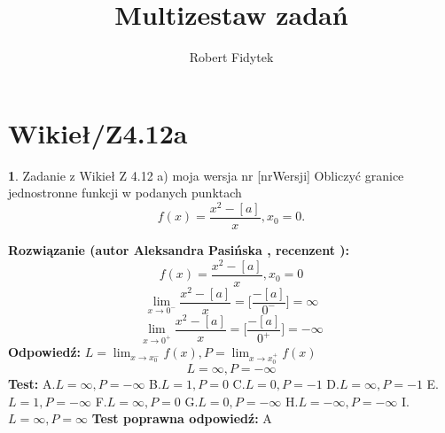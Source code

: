 \documentclass[12pt, a4paper]{article}
\title{Multizestaw zadań}
\author{Robert Fidytek}
\date{}
\theoremstyle{definition} %
\newtheorem{zad}{}
\newcommand{\kategoria}[1]{\section{#1}} %
\newcommand{\zadStart}[1]{\begin{zad}#1\newline} %
\newcommand{\zadStop}{\end{zad}}   %
\newcommand{\rozwStart}[2]{\noindent \textbf{Rozwiązanie (autor #1 , recenzent #2): }\newline} %
\newcommand{\rozwStop}{\newline}                                            %
\newcommand{\odpStart}{\noindent \textbf{Odpowiedź:}\newline}    %
\newcommand{\odpStop}{\newline}                                             %
\newcommand{\testStart}{\noindent \textbf{Test:}\newline} %
\newcommand{\testStop}{\newline} %
\newcommand{\kluczStart}{\noindent \textbf{Test poprawna odpowiedź:}\newline} %
\newcommand{\kluczStop}{\newline} %
\begin{document}
\maketitle


\kategoria{Wikieł/Z4.12a}
\zadStart{Zadanie z Wikieł Z 4.12 a) moja wersja nr [nrWersji]}
Obliczyć granice jednostronne funkcji w podanych punktach $$f(x)=\frac{x^2-[a]}{x},x_{0}=0.$$
\zadStop
\rozwStart{Aleksandra Pasińska}{}
$$f(x)=\frac{x^2-[a]}{x},x_{0}=0$$
$$\lim_{x\rightarrow 0^-}\frac{x^2-[a]}{x}=\biggl[\frac{-[a]}{0^-}\biggr]=\infty$$ 
$$\lim_{x\rightarrow 0^+}\frac{x^2-[a]}{x}=\biggl[\frac{-[a]}{0^+}\biggr]=-\infty$$ 
\rozwStop
\odpStart
$ L=\lim_{x\rightarrow x_{0}^-}f(x), P=\lim_{x\rightarrow x_{0}^+}f(x)$
$$L=\infty, P=-\infty$$
\odpStop
\testStart
A.$ L=\infty, P=-\infty $
B.$L=1, P=0 $
C.$L=0, P=-1 $
D.$L=\infty, P=-1 $
E.$L=1, P=-\infty $
F.$L=\infty, P=0 $
G.$L=0, P=-\infty $
H.$L=-\infty, P=-\infty $
I.$L=\infty, P=\infty $
\testStop
\kluczStart
A
\kluczStop
\end{document}

